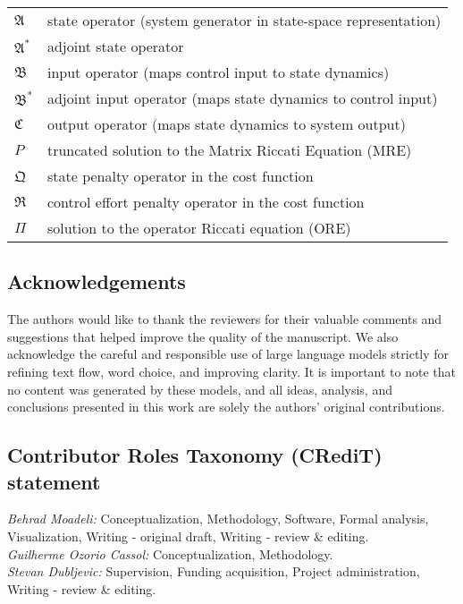 \begin{table}[ht]
\begin{tabular}{ll}
$\mathfrak{A}$ & state operator (system generator in state-space representation) \\
$\mathfrak{A}^*$ & adjoint state operator \\
$\mathfrak{B}$ & input operator (maps control input to state dynamics) \\
$\mathfrak{B}^*$ & adjoint input operator (maps state dynamics to control input) \\
$\mathfrak{C}$ & output operator (maps state dynamics to system output) \\
$P$ & truncated solution to the Matrix Riccati Equation (MRE) \\
$\mathfrak{Q}$ & state penalty operator in the cost function \\
$\mathfrak{R}$ & control effort penalty operator in the cost function \\
$\Pi$ & solution to the operator Riccati equation (ORE) \\
\bottomrule
\end{tabular}
\label{tab:nomenclature}
\end{table}


\newpage
\subsection*{Acknowledgements}
\label{sec:ack}

The authors would like to thank the reviewers for their valuable comments and suggestions that helped improve the quality of the manuscript. We also acknowledge the careful and responsible use of large language models strictly for refining text flow, word choice, and improving clarity. It is important to note that no content was generated by these models, and all ideas, analysis, and conclusions presented in this work are solely the authors’ original contributions.

\subsection*{Contributor Roles Taxonomy (CRediT) statement}

\textit{Behrad Moadeli:} Conceptualization, Methodology, Software, Formal analysis, Visualization, Writing - original draft, Writing - review \& editing.\\
\textit{Guilherme Ozorio Cassol:} Conceptualization, Methodology.\\
\textit{Stevan Dubljevic:} Supervision, Funding acquisition, Project administration, Writing - review \& editing.